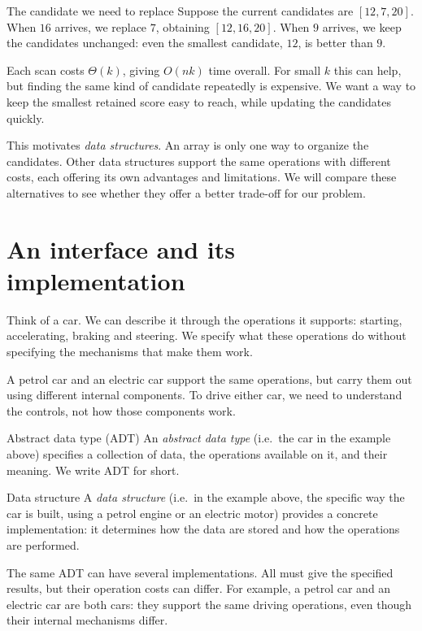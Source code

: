 \documentclass[a4paper,12pt,oneside]{report}
\begin{document}
\begin{framedexample}{The candidate we need to replace}
Suppose the current candidates are $[12,7,20]$. When $16$ arrives,
we replace $7$, obtaining $[12,16,20]$. When $9$ arrives, we keep
the candidates unchanged: even the smallest candidate, $12$, is
better than $9$.
\end{framedexample}

Each scan costs $\Theta(k)$, giving $O(nk)$ time overall. For small
$k$ this can help, but finding the same kind of candidate repeatedly
is expensive. We want a way to keep the smallest retained score
easy to reach, while updating the candidates quickly.

This motivates \emph{data structures}. An array is only one way to
organize the candidates. Other data structures support the same
operations with different costs, each offering its own advantages
and limitations. We will compare these alternatives to see whether
they offer a better trade-off for our problem.

\section{An interface and its implementation}

Think of a car. We can describe it through the operations it
supports: starting, accelerating, braking and steering. We specify
what these operations do without specifying the mechanisms that
make them work.

A petrol car and an electric car support the same operations, but
carry them out using different internal components. To drive either
car, we need to understand the controls, not how those components
work.

\begin{frameddefn}{Abstract data type (ADT)}
An \emph{abstract data type} (i.e.\ the car in the example above)
specifies a collection of data, the operations available on it,
and their meaning. We write ADT for short.
\end{frameddefn}

\begin{frameddefn}{Data structure}
A \emph{data structure} (i.e.\ in the example above, the specific way
the car is built, using a petrol engine or an electric motor) provides a concrete
implementation: it determines how the data are stored and how
the operations are performed.
\end{frameddefn}

The same ADT can have several implementations. All must give the
specified results, but their operation costs can differ.
For example, a petrol car and an electric car are both cars: they
support the same driving operations, even though their internal
mechanisms differ.
\end{document}
